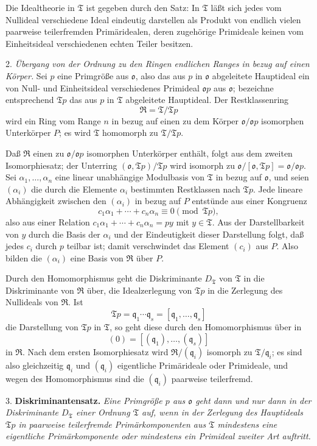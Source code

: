 \documentclass[11pt]{article}
\providecommand{\mR}{\mathfrak{R}}
\providecommand{\mT}{\mathfrak{T}}
\providecommand{\mo}{\mathfrak{o}}
\providecommand{\mq}{\mathfrak{q}}
\begin{document}
Die Idealtheorie in $\mT$ ist gegeben durch den Satz: In $\mT$ läßt sich jedes vom Nullideal verschiedene Ideal eindeutig darstellen als Produkt von endlich vielen paarweise teilerfremden Primäridealen, deren zugehörige Primideale keinen vom Einheitsideal verschiedenen echten Teiler besitzen.

2. \emph{Übergang von der Ordnung zu den Ringen endlichen Ranges in bezug auf einen Körper.} Sei $p$ eine Primgröße aus $\mo$, also das aus $p$ in $\mo$ abgeleitete Hauptideal ein von Null- und Einheitsideal verschiedenes Primideal $\mo p$ aus $\mo$; bezeichne entsprechend $\mT p$ das aus $p$ in $\mT$ abgeleitete Hauptideal. Der Restklassenring
\[
        \mR=\mT/\mT p
\]
wird ein Ring vom Range $n$ in bezug auf einen zu dem Körper $\mo/\mo p$ isomorphen Unterkörper $P$; es wird $\mT$ homomorph zu $\mT/\mT p$.

Daß $\mR$ einen zu $\mo/\mo p$ isomorphen Unterkörper enthält, folgt aus dem zweiten Isomorphiesatz; der Unterring $(\mo,\mT p)/\mT p$ wird isomorph zu $\mo/[\mo,\mT p]=\mo/\mo p$. Sei $\alpha_1,\ldots,\alpha_n$ eine linear unabhängige Modulbasis von $\mT$ in bezug auf $\mo$, und seien $(\alpha_i)$ die durch die Elemente $\alpha_i$ bestimmten Restklassen nach $\mT p$. Jede lineare Abhängigkeit zwischen den $(\alpha_i)$ in bezug auf $P$ entstünde aus einer Kongruenz
\[
        c_1\alpha_1+\cdots+c_n\alpha_n\equiv0\pmod{\mT p},
\]
also aus einer Relation $c_1\alpha_1+\cdots+c_n\alpha_n=py$ mit $y\in\mT$. Aus der Darstellbarkeit von $y$ durch die Basis der $\alpha_i$ und der Eindeutigkeit dieser Darstellung folgt, daß jedes $c_i$ durch $p$ teilbar ist; damit verschwindet das Element $(c_i)$ aus $P$. Also bilden die $(\alpha_i)$ eine Basis von $\mR$ über $P$.

Durch den Homomorphismus geht die Diskriminante $D_\mT$ von $\mT$ in die Diskriminante von $\mR$ über, die Idealzerlegung von $\mT p$ in die Zerlegung des Nullideals von $\mR$. Ist
\[
        \mT p=\mq_1\cdots\mq_s=[\mq_1,\ldots,\mq_s]
\]
die Darstellung von $\mT p$ in $\mT$, so geht diese durch den Homomorphismus über in
\[
        (0)=[(\mq_1),\ldots,(\mq_s)]
\]
in $\mR$. Nach dem ersten Isomorphiesatz wird $\mR/(\mq_i)$ isomorph zu $\mT/\mq_i$; es sind also gleichzeitig $\mq_i$ und $(\mq_i)$ eigentliche Primärideale oder Primideale, und wegen des Homomorphismus sind die $(\mq_i)$ paarweise teilerfremd.

3. \textbf{Diskriminantensatz.} \emph{Eine Primgröße $p$ aus $\mo$ geht dann und nur dann in der Diskriminante $D_\mT$ einer Ordnung $\mT$ auf, wenn in der Zerlegung des Hauptideals $\mT p$ in paarweise teilerfremde Primärkomponenten aus $\mT$ mindestens eine eigentliche Primärkomponente oder mindestens ein Primideal zweiter Art auftritt.}
\end{document}
